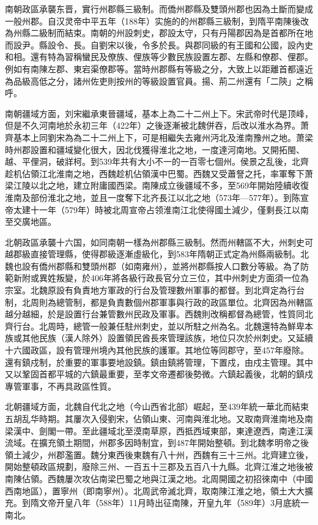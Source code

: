 南朝政區承襲东晋，實行州郡縣三級制。而僑州郡縣及雙頭州郡也因為土斷而變成一般州郡。自汉灵帝中平五年（188年）实施的的州郡縣三級制，到隋平南陳後改為州縣二級制而結束。南朝的州設刺史，郡設太守，只有丹陽郡因為是首都所在地而設尹。縣設令、長。自劉宋以後，令多於長。與郡同級的有王國和公國，設內史和相。還有特為習稱蠻民及僚族、俚族等少數民族設置左郡、左縣和僚郡、俚郡。例如有南陳左郡、東宕渠僚郡等。當時州郡縣有等級之分，大致上以距離首都遠近為品級高低之分，諸州佐吏則按州的等級設置官員。揚、荊二州還有「二陝」之稱呼。

南朝疆域方面，刘宋繼承東晉疆域，基本上為二十二州上下。宋武帝时代是顶峰，但是不久河南地於永初三年（422年）之後逐漸被北魏併吞，后改以淮水為界。萧齊基本上同劉宋為為二十二州上下，可是相繼失去雍州沔北及淮南豫州之地。萧梁時州郡設置和疆域變化很大，因北伐獲得淮北之地，一度達河南地。又開拓閩、越、平俚洞，破牂柯。到539年共有大小不一的一百零七個州。侯景之乱後，北齊趁机佔領江北淮南之地，西魏趁机佔領漢中巴蜀。西魏又受蕭詧之托，率軍奪下萧梁江陵以北之地，建立附庸國西梁。南陳成立後疆域不多，至569年開始陸續收復淮南及部份淮北之地，並且一度奪下北齐長江以北之地（573年—577年）。到陈宣帝太建十一年（579年）時被北周宣帝占领淮南江北使得國土減少，僅剩長江以南至交廣地區。

北朝政區承襲十六国，如同南朝一樣為州郡縣三級制。然而州轄區不大，州刺史可越郡級直接管理縣，使得郡級逐漸虛級化，到583年隋朝正式定為州縣兩級制。北魏也設有僑州郡縣和雙頭州郡（如南雍州），並將州郡縣按人口數分等級。為了防範新附或異姓叛變，於406年將各級行政長官分立三位，其中州刺史方面須一位為宗室。北魏原設有負責地方軍政的行台及管理數州軍事的都督。到北齊定為行台制，北周則為總管制，都是負責數個州郡軍事與行政的政區單位。北齊因為州轄區越分越細，於是設置行台兼管數州民政及軍事。西魏則改稱都督為總管，性質同北齊行台。北周時，總管一般兼任駐州刺史，並以所駐之州為名。北魏還特為鮮卑本族或其他民族（漢人除外）設置領民酋長來管理該族，地位只次於州刺史。又延續十六國政區，設有管理州境內其他民族的護軍。其地位等同郡守，至457年廢除。還有鎮戍制，於重要的軍事要地設鎮。鎮由鎮將管理，下置戍，由戍主管理。其中又以鞏固首都平城的六鎮最重要，至孝文帝遷都後勢微。六鎮起義後，北朝的鎮戍專管軍事，不再具政區性質。

北朝疆域方面，北魏自代北之地（今山西省北部）崛起，至439年統一華北而結束五胡乱华時期。其屢次入侵劉宋，佔領山東、河南與淮北地。又取南齊淮南地及南梁漢中、劍閣一帶。至此疆域北至漠南草原，西抵西域東部，東達遼西，南達江漢流域。在擴充領土期間，州郡多因時制宜，到487年開始整頓。到北魏孝明帝之後領土減少，州郡濫置。魏分東西後東魏有八十州，西魏有三十三州。北齊建立後，開始整頓政區規劃，廢除三州、一百五十三郡及五百八十九縣。北齊江淮之地後被南陳佔領。西魏屢次攻佔南梁巴蜀之地與江漢之地。北周開國之初招徠南中（中國西南地區），置寧州（即南寧州）。北周武帝滅北齊，取南陳江淮之地，領土大大擴充。到隋文帝开皇八年（588年）11月時出征南陳，开皇九年（589年）3月底統一南北。

